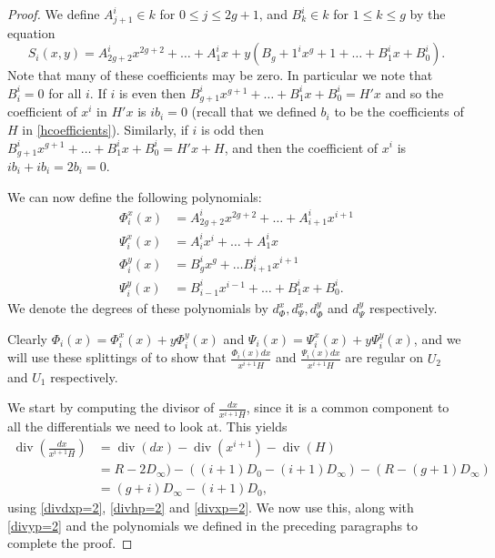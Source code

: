 \documentclass[draft, 11pt]{article} %
\theoremstyle{plain}
\theoremstyle{remark}
\DeclareMathOperator{\di}{div}
\begin{document}
\begin{proof}
We define $A^i_{j+1} \in k$ for $0 \leq j \leq 2g+1$, and $B_k^i \in k$ for $1\leq k \leq g$ by the equation
\[
S_i(x,y) = A_{2g+2}^ix^{2g+2} + \ldots + A^i_1 x + y(B_g+1^i x^g+1 + \ldots + B_1^i x + B_0^i).
\]
Note that many of these coefficients may be zero.
In particular we note that $B_i^i = 0$ for all $i$.
If $i$ is even then $B_{g+1}^ix^{g+1} + \ldots + B_1^ix + B_0^i = H'x$ and so the coefficient of $x^i$ in $H'x$ is $ib_i = 0$ (recall that we defined $b_i$ to be the coefficients of $H$ in \eqref{hcoefficients}).
Similarly, if $i$ is odd then $B_{g+1}^ix^{g+1} + \ldots + B_1^ix + B_0^i = H'x + H$, and then the coefficient of $x^i$ is $ib_i+ ib_i = 2b_i = 0$.


We can now define the following polynomials:
\begin{equation}\label{Split}
\begin{split}
\Phi_i^x(x) & =  A^i_{2g+2}x^{2g+2} + \ldots + A^i_{i+1}x^{i+1} \\
\Psi_i^x(x) & =  A^i_ix^i + \ldots + A^i_1x \\
\Phi_i^y(x) & =  B_g^ix^g + \ldots B_{i+1}^ix^{i+1} \\
\Psi_i^y(x) & =  B_{i-1}^ix^{i-1} + \ldots + B_1^ix + B_0^i.
\end{split}
\end{equation}
We denote the degrees of these polynomials by $d_{\Phi}^x, d_{\Psi}^x, d_{\Phi}^y$ and $d_{\Psi}^y$ respectively.

Clearly $\Phi_i(x) = \Phi_i^x(x) + y\Phi_i^y(x)$ and $\Psi_i (x)= \Psi_i^x(x) + y\Psi_i^y(x)$, and we will use these splittings of to show that $\frac{ \Phi_i(x) dx}{x^{i+1}H}$ and $\frac{\Psi_i(x) dx}{x^{i+1}H}$ are regular on $U_2$ and $U_1$ respectively.

We start by computing the divisor of $\frac{dx}{x^{i+1}H}$, since it is a common component to all the differentials we need to look at.
This yields
\begin{align}
\di \left( \frac{dx}{x^{i+1}H} \right) & = \di(dx) - \di (x^{i+1}) - \di (H) \nonumber \\
& = R-2D_\infty) - ((i+1)D_0 - (i+1)D_\infty) - (R - (g+1)D_\infty) \nonumber \\
& = (g+i)D_\infty - (i+1)D_0,
\end{align}
using \eqref{divdxp=2}, \eqref{divhp=2} and \eqref{divxp=2}.
We now use this, along with \eqref{divyp=2} and the polynomials we defined in the preceding paragraphs to complete the proof.


\end{proof}
\end{document}
